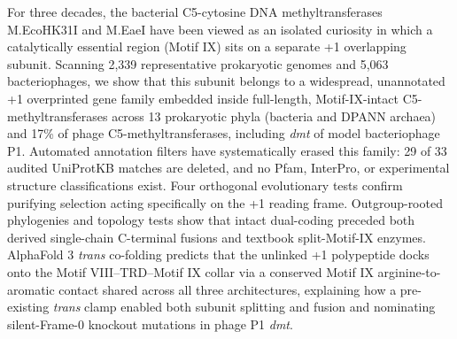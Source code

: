 \documentclass[10pt,letterpaper]{article}
\newcommand{\gene}[1]{\textit{#1}}
\begin{document}
\thispagestyle{firstpage}

\vspace{5pt}

\vspace{2pt}
\noindent{\color{RuleGray}\rule{\textwidth}{0.7pt}}
\vspace{4pt}

\vspace{2pt}

For three decades, the bacterial C5-cytosine DNA methyltransferases M.EcoHK31I and M.EaeI have been viewed as an isolated curiosity in which a catalytically essential region (Motif IX) sits on a separate +1 overlapping subunit. Scanning 2,339 representative prokaryotic genomes and 5,063 bacteriophages, we show that this subunit belongs to a widespread, unannotated +1 overprinted gene family embedded inside full-length, Motif-IX-intact C5-methyltransferases across 13 prokaryotic phyla (bacteria and DPANN archaea) and 17\% of phage C5-methyltransferases, including \gene{dmt} of model bacteriophage P1. Automated annotation filters have systematically erased this family: 29 of 33 audited UniProtKB matches are deleted, and no Pfam, InterPro, or experimental structure classifications exist. Four orthogonal evolutionary tests confirm purifying selection acting specifically on the +1 reading frame. Outgroup-rooted phylogenies and topology tests show that intact dual-coding preceded both derived single-chain C-terminal fusions and textbook split-Motif-IX enzymes. AlphaFold 3 \textit{trans} co-folding predicts that the unlinked +1 polypeptide docks onto the Motif VIII--TRD--Motif IX collar via a conserved Motif IX arginine-to-aromatic contact shared across all three architectures, explaining how a pre-existing \textit{trans} clamp enabled both subunit splitting and fusion and nominating silent-Frame-0 knockout mutations in phage P1 \gene{dmt}.
\end{document}
